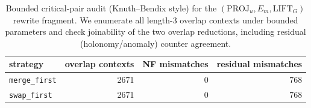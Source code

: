 \begin{table}[H]
\centering
\scriptsize
\setlength{\tabcolsep}{6pt}
\caption{Bounded critical-pair audit (Knuth--Bendix style) for the $(\mathrm{PROJ}_u,E_m,\mathrm{LIFT}_G)$ rewrite fragment. We enumerate all length-3 overlap contexts under bounded parameters and check joinability of the two overlap reductions, including residual (holonomy/anomaly) counter agreement.}
\label{tab:pom_projword_three_gen_kb_completion_audit}
\begin{tabular}{l r r r}
\toprule
strategy & overlap contexts & NF mismatches & residual mismatches\\
\midrule
\texttt{merge\_first} & 2671 & 0 & 768\\
\texttt{swap\_first} & 2671 & 0 & 768\\
\bottomrule
\end{tabular}
\end{table}
